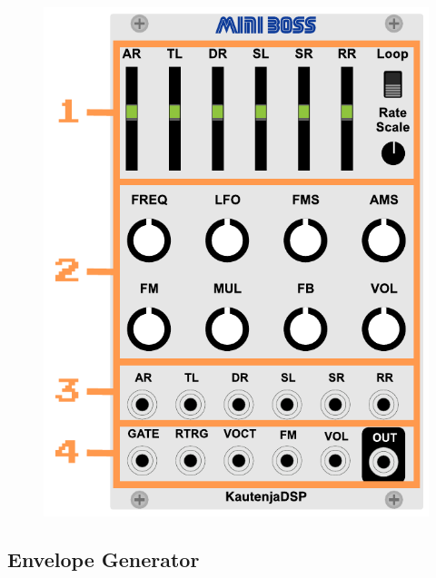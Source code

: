 \documentclass[12pt,letter]{article}
\begin{document}
\begin{figure}[!htp]
\centering
\includegraphics[width=\maxwidth{\textwidth}]{img/Interface}
\end{figure}

\subsection{Envelope Generator}
\end{document}
